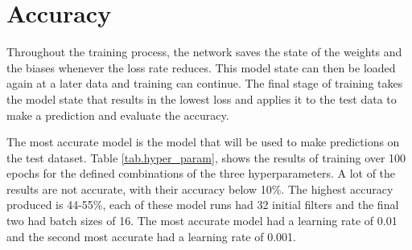 \section{Accuracy}
Throughout the training process, the network saves the state of the weights and the biases whenever the loss rate reduces. This model state can then be loaded again at a later data and training can continue. The final stage of training takes the model state that results in the lowest loss and applies it to the test data to make a prediction and evaluate the accuracy.
\par
The most accurate model is the model that will be used to make predictions on the test dataset. Table \ref{tab.hyper_param}, shows the results of training over 100 epochs for the defined combinations of the three hyperparameters. A lot of the results are not accurate, with their accuracy below 10\%. The highest accuracy produced is 44-55\%, each of these model runs had 32 initial filters and the final two had batch sizes of 16. The most accurate model had a learning rate of 0.01 and the second most accurate had a learning rate of 0.001. 
